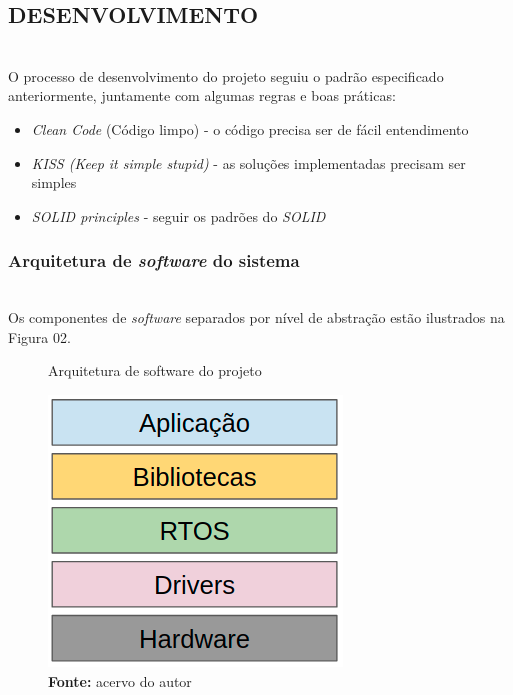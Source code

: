 \documentclass[times, twoside, watermark]{artigo}
\begin{document}

\subsection{DESENVOLVIMENTO}\hfill\\

O processo de desenvolvimento do projeto seguiu o padrão especificado anteriormente,
juntamente com algumas regras e boas práticas:

\begin{itemize}
\item \textit{Clean Code} (Código limpo) - o código precisa ser de fácil 
entendimento\cite{martin2009clean}
\item \textit{KISS (Keep it simple stupid)} - as soluções implementadas precisam ser 
simples\cite{martin2018clean}
\item \textit{SOLID principles} - seguir os padrões do \textit{SOLID}
\cite{martin2002agile}
\end{itemize}

\subsubsection{Arquitetura de \textit{software} do sistema}\hfill\\
Os componentes de \textit{software} separados por nível de abstração estão ilustrados na Figura 02.\hfill\\

\begin{figure}[H]
    \centering
    \caption{Arquitetura de software do projeto}
    \includegraphics[width=0.7\linewidth]{images/arch.png}
    \caption*{\newline\textbf{Fonte:} acervo do autor}
\end{figure}
\end{document}
